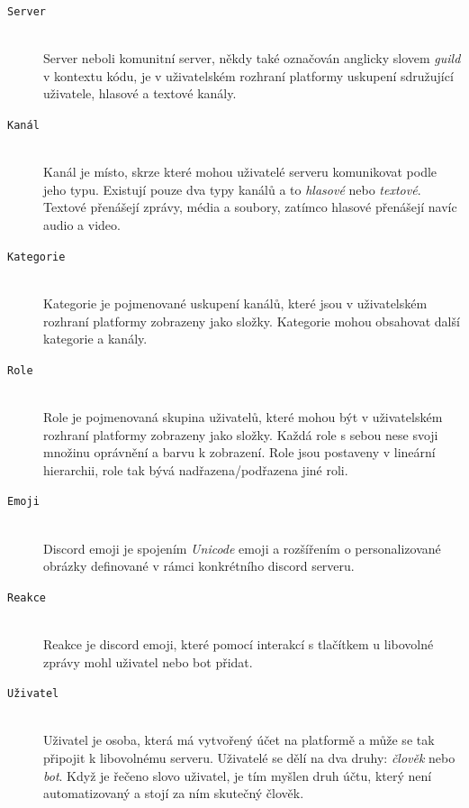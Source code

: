 \documentclass[
  program=inf,
biblatex=false,
sourcecodes=true,
joinlists=true,
  figures=true,
  tables=true,
  glossaries=true,
  index=false
]{kidiplom}
\begin{document}
\begin{description}
\item[\texttt{Server}] \hfill \\
Server neboli komunitní server, někdy také označován anglicky slovem {\it guild} v kontextu kódu,
je v uživatelském rozhraní platformy uskupení sdružující uživatele, hlasové
a textové kanály.
  
\item[\texttt{Kanál}] \hfill \\
    Kanál je místo, skrze které mohou uživatelé serveru komunikovat podle jeho typu.
    Existují pouze dva typy kanálů a to {\it hlasové} nebo {\it textové}.
    Textové přenášejí zprávy, média a soubory, zatímco hlasové přenášejí navíc audio
    a video.
  
\item[\texttt{Kategorie}] \hfill \\
    Kategorie je pojmenované uskupení kanálů, které jsou v uživatelském rozhraní platformy
    zobrazeny jako složky. Kategorie mohou obsahovat další kategorie a kanály.
  
\newpage
\item[\texttt{Role}] \hfill \\
    Role je pojmenovaná skupina uživatelů, které mohou být v uživatelském rozhraní platformy
    zobrazeny jako složky. Každá role s sebou nese svoji množinu
    oprávnění a barvu k zobrazení. Role jsou postaveny
    v lineární hierarchii, role tak bývá nadřazena/podřazena jiné roli.
  
\item[\texttt{Emoji}] \hfill \\
    Discord emoji je spojením {\it Unicode} emoji a rozšířením o
    personalizované obrázky definované v rámci
    konkrétního discord serveru.
  
\item[\texttt{Reakce}] \hfill \\
    Reakce je discord emoji, které pomocí interakcí s tlačítkem u libovolné 
    zprávy mohl uživatel nebo bot přidat.

\item[\texttt{Uživatel}] \hfill \\
    Uživatel je osoba, která má vytvořený účet na platformě a může se tak připojit
    k libovolnému serveru. Uživatelé se dělí na dva druhy: {\it člověk} nebo {\it bot}. 
    Když je řečeno slovo uživatel, je tím myšlen druh účtu, který není automatizovaný 
    a stojí za ním skutečný člověk.


\end{description}
\end{document}
